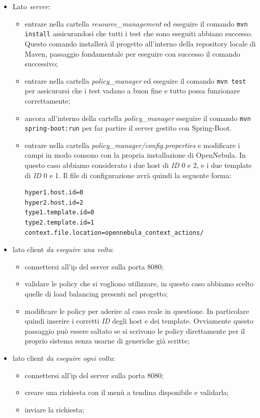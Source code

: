 \begin{itemize}
    \item Lato \emph{server}:
\begin{itemize}
    \item entrare nella cartella \emph{resource\_management} ed eseguire il comando \texttt{mvn install} assicurandosi che tutti i test che sono eseguiti abbiano successo. Questo comando installerà il progetto all'interno della repository locale di Maven, passaggio fondamentale per eseguire con successo il comando successivo;
    \item entrare nella cartella \emph{policy\_manager} ed eseguire il comando \texttt{mvn test} per assicurarsi che i test vadano a buon fine e tutto possa funzionare correttamente;
    \item ancora all'interno della cartella \emph{policy\_manager} eseguire il comando \texttt{mvn spring-boot:run} per far partire il server gestito con Spring-Boot.
    \item entrare nella cartella \emph{policy\_manager/config.properties} e modificare i campi in modo consono con la propria installazione di OpenNebula. In questo caso abbiamo considerato i due host di \emph{ID} 0 e 2, e i due template di \emph{ID} 0 e 1. Il file di configurazione avrà quindi la seguente forma:
    \begin{lstlisting}[xleftmargin=1em, label={code:config_properties}, caption={config.properties}]
hyper1.host.id=0
hyper2.host.id=2
type1.template.id=0
type2.template.id=1
context.file.location=opennebula_context_actions/
    \end{lstlisting}
\end{itemize}
    \item lato client \emph{da eseguire una volta}:
    \begin{itemize}
        \item connettersi all'ip del server sulla porta 8080;
        \item validare le policy che si vogliono utilizzare, in questo caso abbiamo scelto quelle di load balancing presenti nel progetto;
        \item modificare le policy per aderire al caso reale in questione. In particolare quindi inserire i corretti \emph{ID} degli host e dei template. Ovviamente questo passaggio può essere saltato se si scrivono le policy direttamente per il proprio sistema senza usarne di generiche già scritte;
    \end{itemize}
    \item lato client \emph{da eseguire ogni volta}:
    \begin{itemize}
        \item connettersi all'ip del server sulla porta 8080;
        \item creare una richiesta con il menù a tendina disponibile e validarla;
        \item inviare la richiesta;
    \end{itemize}
\end{itemize}
